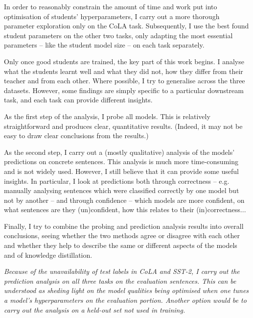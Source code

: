 \documentclass[bsc,frontabs,twoside,singlespacing,parskip,deptreport]{infthesis}
\begin{document}
{{    %
    In order to reasonably constrain the amount of time and work put into optimisation of students' hyperparameters, I carry out a more thorough parameter exploration only on the CoLA task. Subsequently, I use the best found student parameters on the other two tasks, only adapting the most essential parameters -- like the student model size -- on each task separately.

    Only once good students are trained, the key part of this work begins. I analyse what the students learnt well and what they did not, how they differ from their teacher and from each other. Where possible, I try to generalise across the three datasets. However, some findings are simply specific to a particular downstream task, and each task can provide different insights.

    As the first step of the analysis, I probe all models. This is relatively straightforward and produces clear, quantitative results. (Indeed, it may not be easy to draw clear conclusions from the results.)

    As the second step, I carry out a (mostly qualitative) analysis of the models' predictions on concrete sentences. This analysis is much more time-consuming and is not widely used. However, I still believe that it can provide some useful insights. In particular, I look at predictions both through correctness -- e.g. manually analysing sentences which were classified correctly by one model but not by another -- and through confidence -- which models are more confident, on what sentences are they (un)confident, how this relates to their (in)correctness...

    Finally, I try to combine the probing and prediction analysis results into overall conclusions, seeing whether the two methods agree or disagree with each other and whether they help to describe the same or different aspects of the models and of knowledge distillation.

    \textit{Because of the unavailability of test labels in CoLA and SST-2, I carry out the prediction analysis on all three tasks on the evaluation sentences. This can be understood as sheding light on the model qualities being optimised when one tunes a model's hyperparameters on the evaluation portion. Another option would be to carry out the analysis on a held-out set not used in training.}
  }

}
\end{document}
